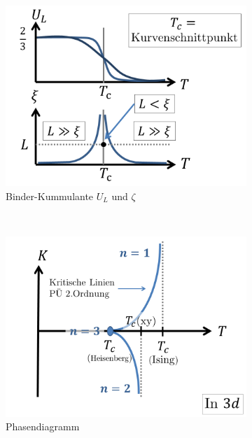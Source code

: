 \documentclass[12pt]{article}
\begin{document}
\begin{figure}[h] 
		\begin{subfigure}[h]{0.5 \textwidth}
		\centering
		\includegraphics[width=\textwidth]{Folie43.png}
		\caption{Binder-Kummulante $U_L$ und $\zeta$} 
		\label{fig:Binder_Kummulante}
		\centering
	\end{subfigure}
	~
\begin{subfigure}[h]{0.5\textwidth}
		\centering
		\includegraphics[width=\textwidth]{Folie44.png}
		\caption{Phasendiagramm}
		\label{fig:Phasen_Diagramm}
		\centering
	\end{subfigure}
	\caption{} %
\end{figure}	
\end{document}
